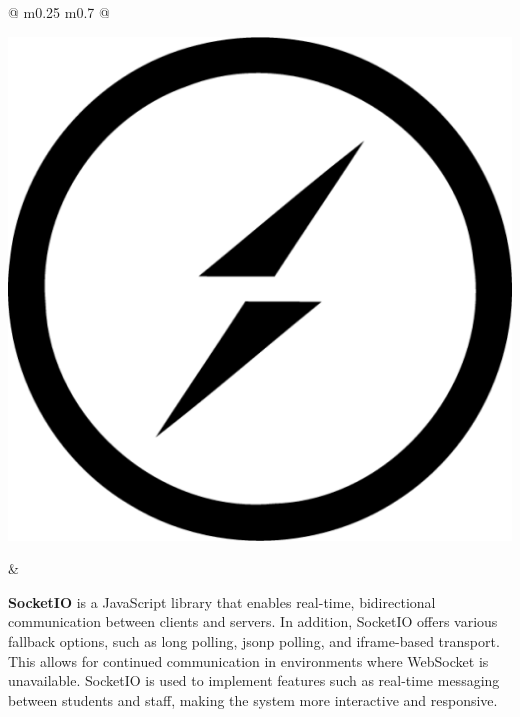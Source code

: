 	\vspace*{0.5cm}
	\newpage
	\begin{tabular}{ @{} m{0.25\textwidth} m{0.7\textwidth} @{} }
		\begin{minipage}{\linewidth}
			\centering
			\includegraphics[width=0.45\linewidth]{graphics/socket-io.512x512.png}
			\label{fig:socketio}
		\end{minipage}
		&
		\begin{minipage}{\linewidth}
			\textbf{SocketIO} is a JavaScript library that enables real-time, bidirectional communication between clients and servers. \cite{socketio} In addition, SocketIO offers various fallback options, such as long polling, \acs{jsonp} polling, and iframe-based transport. This allows for continued communication in environments where WebSocket is unavailable. \cite{socketio-vs-websocket} SocketIO is used to implement features such as real-time messaging between students and staff, making the system more interactive and responsive. 
		\end{minipage}
	\end{tabular}
	
	
